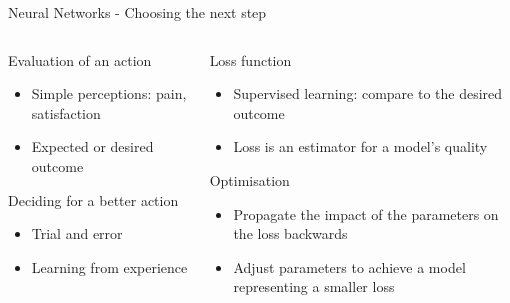 \begin{frame}{Neural Networks - Choosing the next step}
\begin{columns}
\quad
    \begin{column}{0.45\textwidth}
    \begin{block}{Evaluation of an action}
    \begin{itemize}
        \item Simple perceptions: pain, satisfaction
        \item Expected or desired outcome
    \end{itemize}
    \end{block}
    \begin{block}{Deciding for a better action}
    \begin{itemize}
        \item Trial and error
        \item Learning from experience
    \end{itemize}
    \end{block}
    \end{column}
    \quad
    \begin{column}{0.45\textwidth}
    \begin{block}{Loss function}
    \begin{itemize}
        \item Supervised learning: compare to the desired outcome
        \item Loss is an estimator for a model's quality
    \end{itemize}
    \end{block}
    \begin{block}{Optimisation}
    \begin{itemize}
        \item Propagate the impact of the parameters on the loss backwards
        \item Adjust parameters to achieve a model representing a smaller loss
    \end{itemize}
    \end{block}
    \end{column}
\quad
\end{columns}
\end{frame}

